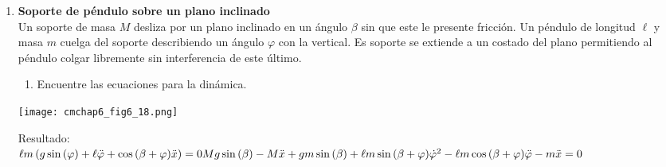 \documentclass[11pt, a4paper, twoside]{article}
\begin{document}
\begin{enumerate}
\item
	\begin{minipage}[t][3.5cm]{0.7\textwidth}
		\textbf{Soporte de péndulo sobre un plano inclinado}\\
		Un soporte de masa \(M\) desliza por un plano inclinado en un ángulo \(\beta\) sin que este le presente fricción.
		Un péndulo de longitud \(\ell\) y masa \(m\) cuelga del soporte describiendo un ángulo \(\varphi\) con la vertical.
		Es soporte se extiende a un costado del plano permitiendo al péndulo colgar libremente sin interferencia de este último.
		\begin{enumerate}
			\item Encuentre las ecuaciones para la dinámica.
		\end{enumerate}
	\end{minipage}
	\begin{minipage}[c][1cm][t]{0.3\textwidth}
		\texttt{[image: cmchap6\_fig6\_18.png]}
	\end{minipage}
	Resultado:\\
	\(
		\ell m \left(g \sin{\left(\varphi \right)} + \ell \ddot{\varphi} + \cos{\left(\beta + \varphi \right)} \ddot{x}\right) = 0 \\
		M g \sin{\left(\beta \right)} - M \ddot{x} + g m \sin{\left(\beta \right)} + \ell m \sin{\left(\beta + \varphi \right)} \dot{\varphi}^{2} - \ell m \cos{\left(\beta + \varphi \right)} \ddot{\varphi} - m \ddot{x} = 0
	\)




\end{enumerate}
\end{document}
